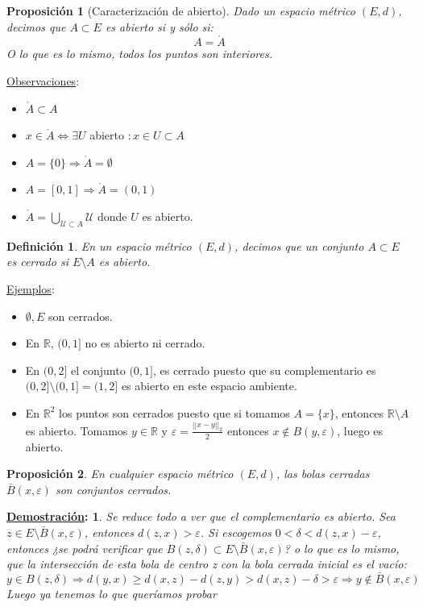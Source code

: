 \documentclass[10pt,a4paper,openright]{book}
\theoremstyle{break}
\newtheorem*{defi}{Definición}
\newtheorem*{prop}{Proposición}
\newtheorem*{demo}{\underline{Demostración}:}
\begin{document}
\begin{prop}[Caracterización de abierto]
Dado un espacio métrico $(E,d)$, decimos que $A\subset E$ es abierto si y sólo si:
$$A = \mathring{A}$$
O lo que es lo mismo, todos los puntos son interiores.
\end{prop}

\underline{Observaciones}:
\begin{itemize}
\item $\mathring{A} \subset A$
\item $x \in \mathring{A} \Leftrightarrow \exists U$ abierto $: x \in U \subset A$
\item $A=\{0\}\Rightarrow \mathring{A} = \emptyset$
\item $A = [0,1]\Rightarrow\mathring{A} = (0,1)$
\item $\mathring{A} = \bigcup_{\mathcal{U} \subset A} \mathcal{U}$ donde $U$ es abierto.
\end{itemize}

\begin{defi}
En un espacio métrico $(E,d)$, decimos que un conjunto $A\subset E$ es cerrado si $E\setminus{A}$ es abierto.
\end{defi}

\underline{Ejemplos}:
\begin{itemize}
\item $\emptyset, E$ son cerrados.
\item En $\mathbb{R}$, $(0,1]$ no es abierto ni cerrado.
\item En $(0,2]$ el conjunto $(0,1]$, es cerrado puesto que su complementario es $(0,2]\setminus(0,1] = (1,2]$ es abierto en este espacio ambiente.
\item En $\mathbb{R}^{2}$ los puntos son cerrados puesto que si tomamos $A=\{x\}$, entonces $\mathbb{R}\setminus A$ es abierto. Tomamos $y\in \mathbb{R}$ y $\varepsilon = \frac{||x-y||_2}{2}$ entonces $x\notin B(y,\varepsilon)$, luego es abierto.
\end{itemize}

\begin{prop}
En cualquier espacio métrico $(E,d)$, las bolas cerradas $\bar{B}(x,\varepsilon)$ son conjuntos cerrados.
\end{prop}

\begin{demo}
Se reduce todo a ver que el complementario es abierto. Sea $z\in E\setminus \bar{B}(x,\varepsilon)$, entonces $d(z,x) > \varepsilon$.
Si escogemos $0 < \delta < d(z,x) - \varepsilon$,  entonces ¿se podrá verificar que $B(z,\delta)\subset E\setminus \bar{B}(x,\varepsilon)$? o lo que es lo mismo, que la intersección de esta bola de centro z con la bola cerrada inicial es el vacío:
$$y \in B(z,\delta)\Rightarrow d(y,x)\geq d(x,z) - d(z,y)> d(x,z) - \delta >\varepsilon \Rightarrow y \notin \bar{B}(x,\varepsilon)$$
Luego ya tenemos lo que queríamos probar
\end{demo}
\end{document}

